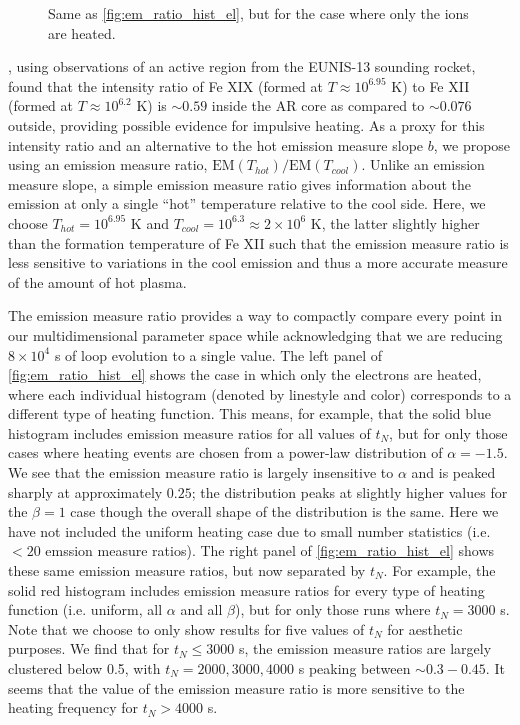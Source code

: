 \documentclass[apj]{emulateapj}
\begin{document}
\begin{figure}
{		}
		\caption{Same as \autoref{fig:em_ratio_hist_el}, but for the case where only the ions are heated.}
		\label{fig:em_ratio_hist_ion}
	\end{figure}
	\par\citet{brosius_pervasive_2014}, using observations of an active region from the EUNIS-13 sounding rocket, found that the intensity ratio of Fe XIX (formed at $T\approx10^{6.95}$ K) to Fe XII (formed at $T\approx10^{6.2}$ K) is $\sim0.59$ inside the AR core as compared to $\sim0.076$ outside, providing possible evidence for impulsive heating. As a proxy for this intensity ratio and an alternative to the hot emission measure slope $b$, we propose using an emission measure ratio, $\mathrm{EM}(T_{hot})/\mathrm{EM}(T_{cool})$. Unlike an emission measure slope, a simple emission measure ratio gives information about the emission at only a single ``hot'' temperature relative to the cool side. Here, we choose $T_{hot}=10^{6.95}$ K and $T_{cool}=10^{6.3}\approx2\times10^6$ K, the latter slightly higher than the formation temperature of Fe XII such that the emission measure ratio is less sensitive to variations in the cool emission and thus a more accurate measure of the amount of hot plasma. 
	\par The emission measure ratio provides a way to compactly compare every point in our multidimensional parameter space while acknowledging that we are reducing $8\times10^4$ s of loop evolution to a single value. The left panel of \autoref{fig:em_ratio_hist_el} shows the case in which only the electrons are heated, where each individual histogram (denoted by linestyle and color) corresponds to a different type of heating function. This means, for example, that the solid blue histogram includes emission measure ratios for all values of $t_N$, but for only those cases where heating events are chosen from a power-law distribution of $\alpha=-1.5$. We see that the emission measure ratio is largely insensitive to $\alpha$ and is peaked sharply at approximately $0.25$; the distribution peaks at slightly higher values for the $\beta=1$ case though the overall shape of the distribution is the same. Here we have not included the uniform heating case due to small number statistics (i.e. $<20$ emssion measure ratios). The right panel of \autoref{fig:em_ratio_hist_el} shows these same emission measure ratios, but now separated by $t_N$. For example, the solid red histogram includes emission measure ratios for every type of heating function (i.e. uniform, all $\alpha$ and all $\beta$), but for only those runs where $t_N=3000$ s. Note that we choose to only show results for five values of $t_N$ for aesthetic purposes. We find that for $t_N\le3000$ s, the emission measure ratios are largely clustered below 0.5, with $t_N=2000,3000,4000$ s peaking between $\sim0.3-0.45$. It seems that the value of the emission measure ratio is more sensitive to the heating frequency for $t_N>4000$ s.
\end{document}
